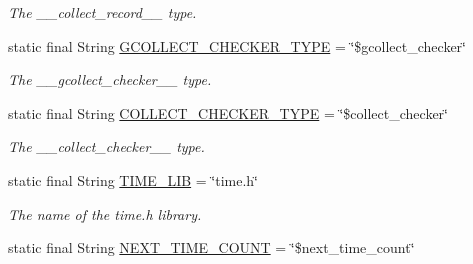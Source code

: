 \begin{DoxyCompactItemize}
\begin{DoxyCompactList}\small\item\em The {\ttfamily \+\_\+\+\_\+collect\+\_\+record\+\_\+\+\_\+} type. \end{DoxyCompactList}\item 
\hypertarget{classedu_1_1udel_1_1cis_1_1vsl_1_1civl_1_1model_1_1IF_1_1ModelConfiguration_aba2df6fc05a42967f533de6f9de28300}{}static final String \hyperlink{classedu_1_1udel_1_1cis_1_1vsl_1_1civl_1_1model_1_1IF_1_1ModelConfiguration_aba2df6fc05a42967f533de6f9de28300}{G\+C\+O\+L\+L\+E\+C\+T\+\_\+\+C\+H\+E\+C\+K\+E\+R\+\_\+\+T\+Y\+P\+E} = \char`\"{}\$gcollect\+\_\+checker\char`\"{}\label{classedu_1_1udel_1_1cis_1_1vsl_1_1civl_1_1model_1_1IF_1_1ModelConfiguration_aba2df6fc05a42967f533de6f9de28300}

\begin{DoxyCompactList}\small\item\em The {\ttfamily \+\_\+\+\_\+gcollect\+\_\+checker\+\_\+\+\_\+} type. \end{DoxyCompactList}\item 
\hypertarget{classedu_1_1udel_1_1cis_1_1vsl_1_1civl_1_1model_1_1IF_1_1ModelConfiguration_ae573e90e44a6dfd2aae4cc33e0ca3701}{}static final String \hyperlink{classedu_1_1udel_1_1cis_1_1vsl_1_1civl_1_1model_1_1IF_1_1ModelConfiguration_ae573e90e44a6dfd2aae4cc33e0ca3701}{C\+O\+L\+L\+E\+C\+T\+\_\+\+C\+H\+E\+C\+K\+E\+R\+\_\+\+T\+Y\+P\+E} = \char`\"{}\$collect\+\_\+checker\char`\"{}\label{classedu_1_1udel_1_1cis_1_1vsl_1_1civl_1_1model_1_1IF_1_1ModelConfiguration_ae573e90e44a6dfd2aae4cc33e0ca3701}

\begin{DoxyCompactList}\small\item\em The {\ttfamily \+\_\+\+\_\+collect\+\_\+checker\+\_\+\+\_\+} type. \end{DoxyCompactList}\item 
\hypertarget{classedu_1_1udel_1_1cis_1_1vsl_1_1civl_1_1model_1_1IF_1_1ModelConfiguration_a4c659f659ca4247d6a9ae46c7d6a478d}{}static final String \hyperlink{classedu_1_1udel_1_1cis_1_1vsl_1_1civl_1_1model_1_1IF_1_1ModelConfiguration_a4c659f659ca4247d6a9ae46c7d6a478d}{T\+I\+M\+E\+\_\+\+L\+I\+B} = \char`\"{}time.\+h\char`\"{}\label{classedu_1_1udel_1_1cis_1_1vsl_1_1civl_1_1model_1_1IF_1_1ModelConfiguration_a4c659f659ca4247d6a9ae46c7d6a478d}

\begin{DoxyCompactList}\small\item\em The name of the time.\+h library. \end{DoxyCompactList}\item 
\hypertarget{classedu_1_1udel_1_1cis_1_1vsl_1_1civl_1_1model_1_1IF_1_1ModelConfiguration_a2d319589be1df5f8c15c023f91ba75d5}{}static final String \hyperlink{classedu_1_1udel_1_1cis_1_1vsl_1_1civl_1_1model_1_1IF_1_1ModelConfiguration_a2d319589be1df5f8c15c023f91ba75d5}{N\+E\+X\+T\+\_\+\+T\+I\+M\+E\+\_\+\+C\+O\+U\+N\+T} = \char`\"{}\$next\+\_\+time\+\_\+count\char`\"{}\label{classedu_1_1udel_1_1cis_1_1vsl_1_1civl_1_1model_1_1IF_1_1ModelConfiguration_a2d319589be1df5f8c15c023f91ba75d5}


\end{DoxyCompactItemize}
